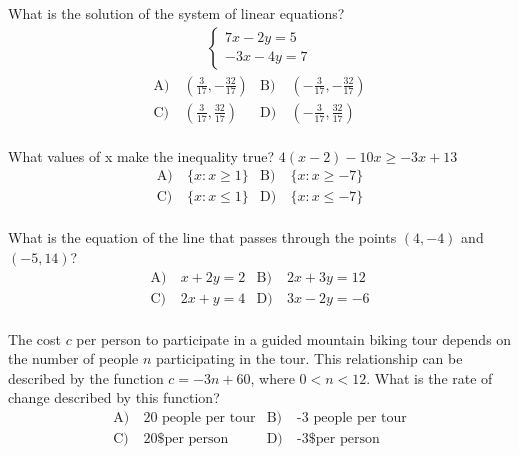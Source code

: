 \begin{problem}\label{Alg19}
What is the solution of the system of linear equations? 
\begin{align*}
    \left\{ \begin{array}{l}
    7x-2y=5\\
    -3x-4y=7
    \end{array}\right.
\end{align*}
\begin{align*}
\text{A)}\ & (\frac{3}{17},-\frac{32}{17}) &
\text{B)}\ & (-\frac{3}{17}, -\frac{32}{17})\\
\text{C)}\ &  (\frac{3}{17},\frac{32}{17}) &
\text{D)}\ & (-\frac{3}{17},\frac{32}{17})\\
\end{align*} 
\end{problem}


\begin{problem}\label{Alg20}
What values of x make the inequality true? $4(x-2)-10x\geq -3x+13$
\begin{align*}
\text{A)}\ & \{x: x\geq 1\} &
\text{B)}\ & \{x: x\geq -7\}\\
\text{C)}\ & \{x: x\leq 1\}  &
\text{D)}\ & \{x: x\leq -7\}\\
\end{align*} 
\end{problem}


\begin{problem}\label{Alg22}
What is the equation of the line that passes through the points $(4,-4)$ and $(-5, 14)$?
\begin{align*}
\text{A)}\ & x+2y=2 &
\text{B)}\ & 2x+3y=12\\
\text{C)}\ & 2x+y=4  &
\text{D)}\ & 3x-2y=-6\\
\end{align*} 
\end{problem}



\begin{problem}\label{Alg23}
The cost $c$ per person to participate in a guided mountain biking tour depends on the number of people $n$ participating in the tour. This relationship can be described by the function $c = -3n + 60$, where $0 < n < 12$. What is the rate of change described by this function?
\begin{align*}
\text{A)}\ & \text{20 people per tour} &
\text{B)}\ & \text{-3 people per tour}\\
\text{C)}\ &  \text{20\$ per person} &
\text{D)}\ & \text{-3\$ per person}\\
\end{align*} 
\end{problem}




